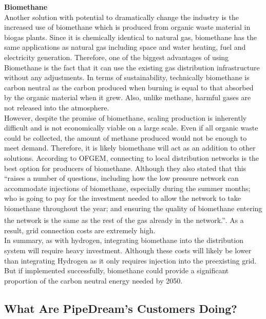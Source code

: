 \documentclass[11pt]{article}		%
\newcommand{\supercite}[1]{\textsuperscript{\cite{#1}}}		%
\begin{document}
            \textbf{Biomethane} \\
            Another solution with potential to dramatically change the industry is the increased use of biomethane which is produced from organic waste material in biogas plants. Since it is chemically identical to natural gas, biomethane has the same applications as natural gas including space and water heating, fuel and electricity generation. Therefore, one of the biggest advantages of using Biomethane is the fact that it can use the existing gas distribution infrastructure without any adjustments. In terms of sustainability, technically biomethane is carbon neutral as the carbon produced when burning is equal to that absorbed by the organic material when it grew. Also, unlike methane, harmful gases are not released into the atmosphere.\\
    	    \hspace*{3ex}However, despite the promise of biomethane, scaling production is inherently difficult and is not economically viable on a large scale. Even if all organic waste could be collected, the amount of methane produced would not be enough to meet demand. Therefore, it is likely biomethane will act as an addition to other solutions. According to OFGEM, connecting to local distribution networks is the best option for producers of biomethane. Although they also stated that this “raises a number of questions, including how the low pressure network can accommodate injections of biomethane, especially during the summer months; who is going to pay for the investment needed to allow the network to take biomethane throughout the year; and ensuring the quality of biomethane entering the network is the same as the rest of the gas already in the network.”\supercite{biomethaneof}. As a result, grid connection costs are extremely high.\\
        	\hspace*{3ex}In summary, as with hydrogen, integrating biomethane into the distribution system will require heavy investment. Although these costs will likely be lower than integrating Hydrogen as it only requires injection into the preexisting grid. But if implemented successfully, biomethane could provide a significant proportion of the carbon neutral energy needed by 2050.
    
    		\subsection[What Are PipeDream's Customers Doing?]{What Are PipeDream's Customers Doing?}
    		
\end{document}
